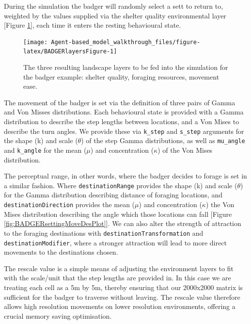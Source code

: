 \documentclass[10pt,a4paper]{article}
\begin{document}
During the simulation the badger will randomly select a sett to return to, weighted by the values supplied via the shelter quality environmental layer {[}Figure \ref{fig:BADGERlayersFigure}{]}, each time it enters the resting behavioural state.

\begin{figure}

{\centering \texttt{[image: Agent-based\_model\_walkthrough\_files/figure-latex/BADGERlayersFigure-1]} 

}

\caption{The three resulting landscape layers to be fed into the simulation for the badger example: shelter quality, foraging resources, movement ease.}\label{fig:BADGERlayersFigure}
\end{figure}

The movement of the badger is set via the definition of three pairs of Gamma and Von Misses distributions.
Each behavioural state is provided with a Gamma distribution to describe the step lengths between locations, and a Von Mises to describe the turn angles.
We provide these via \texttt{k\_step} and \texttt{s\_step} arguments for the shape (k) and scale (\(\theta\)) of the step Gamma distributions, as well as \texttt{mu\_angle} and \texttt{k\_angle} for the mean (\(\mu\)) and concentration (\(\kappa\)) of the Von Mises distribution.

The perceptual range, in other words, where the badger decides to forage is set in a similar fashion.
Where \texttt{destinationRange} provides the shape (k) and scale (\(\theta\)) for the Gamma distribution describing distance of foraging locations, and \texttt{destinationDirection} provides the mean (\(\mu\)) and concentration (\(\kappa\)) the Von Mises distribution describing the angle which those locations can fall {[}Figure \ref{fig:BADGERsettingMoveDesPlot}{]}.
We can also alter the strength of attraction to the foraging destinations with \texttt{destinationTransformation} and \texttt{destinationModifier}, where a stronger attraction will lead to more direct movements to the destinations chosen.

The rescale value is a simple means of adjusting the environment layers to fit with the scale/unit that the step lengths are provided in.
In this case we are treating each cell as a 5m by 5m, thereby ensuring that our 2000x2000 matrix is sufficient for the badger to traverse without leaving.
The rescale value therefore allows high resolution movements on lower resolution environments, offering a crucial memory saving optimisation.
\end{document}
